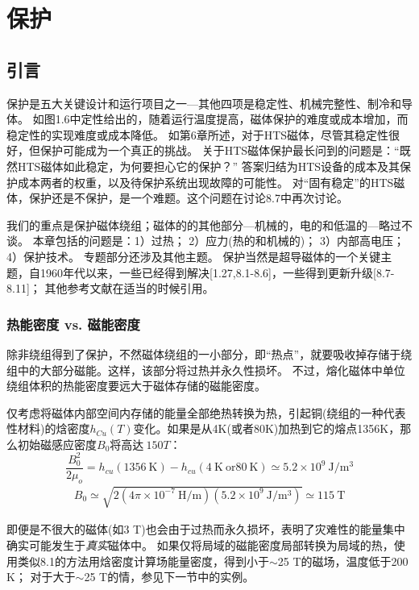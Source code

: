 \chapter{保护}
\section{引言}
保护是五大关键设计和运行项目之一---其他四项是稳定性、机械完整性、制冷和导体。
如图1.6中定性给出的，随着运行温度提高，磁体保护的难度或成本增加，而稳定性的实现难度或成本降低。
如第6章所述，对于HTS磁体，尽管其稳定性很好，但保护可能成为一个真正的挑战。
关于HTS磁体保护最长问到的问题是：“既然HTS磁体如此稳定，为何要担心它的保护？”
答案归结为HTS设备的成本及其保护成本两者的权重，以及待保护系统出现故障的可能性。
对“固有稳定”的HTS磁体，保护还是不保护，是一个难题。这个问题在讨论8.7中再次讨论。

我们的重点是保护磁体绕组；磁体的的其他部分---机械的，电的和低温的---略过不谈。
本章包括的问题是：1）过热； 2）应力(热的和机械的)； 3）内部高电压； 4）保护技术。
专题部分还涉及其他主题。
保护当然是超导磁体的一个关键主题，自1960年代以来，一些已经得到解决[1.27,8.1-8.6]，一些得到更新升级[8.7-8.11]；
其他参考文献在适当的时候引用。

\subsection{热能密度 vs. 磁能密度}
除非绕组得到了保护，不然磁体绕组的一小部分，即“热点”，就要吸收掉存储于绕组中的大部分磁能。这样，该部分将过热并永久性损坏。
不过，熔化磁体中单位绕组体积的热能密度要远大于磁体存储的磁能密度。

仅考虑将磁体内部空间内存储的能量全部绝热转换为热，引起铜(绕组的一种代表性材料)的焓密度$h_{Cu}(T)$变化。如果是从4K(或者80K)加热到它的熔点1356K，那么初始磁感应密度$B_0$将高达$~150 T$：
\begin{equation}%
\frac{B_{0}^{2}}{2\mu_o}=h_{cu}(1356\ \mathrm{K})-h_{cu}(4\ \mathrm{K}\ \mathrm{or}80\ \mathrm{K})\simeq 5.2\times 10^9\ \mathrm{J/m^3}
\end{equation}
\begin{align*}%
B_0\simeq\sqrt{2(4\pi\times 10^{-7}\ \mathrm{H/m})(5.2\times 10^9\ \mathrm{J/m^3})}\simeq 115\ \mathrm{T}
\end{align*}

即便是不很大的磁体(如3 T)也会由于过热而永久损坏，表明了灾难性的能量集中确实可能发生于\textit{真实}磁体中。
如果仅将局域的磁能密度局部转换为局域的热，使用类似8.1的方法用焓密度计算场能量密度，得到小于$\sim$25 T的磁场，温度低于200 K；
对于大于$\sim$25 T的情，参见下一节中的实例。

